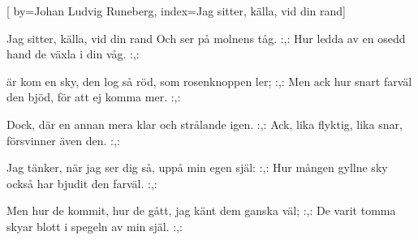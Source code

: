 
[
by={Johan Ludvig Runeberg},
index={Jag sitter, källa, vid din rand}]

\beginverse*
Jag sitter, källa, vid din rand 
Och ser på molnens tåg.
:,: Hur ledda av en osedd hand 
de växla i din våg. :,:
\endverse

\beginverse* 
är kom en sky, den log så röd, 
som rosenknoppen ler; 
:,: Men ack hur snart farväl den bjöd, 
för att ej komma mer. :,:
\endverse

\beginverse* 
Dock, där en annan mera klar 
och strålande igen. 
:,: Ack, lika flyktig, lika snar, 
försvinner även den. :,:
\endverse

\beginverse
Jag tänker, när jag ser dig så, 
uppå min egen själ:
:,: Hur mången gyllne sky också 
har bjudit den farväl. :,:
\endverse

\beginverse* Men hur de kommit, hur de gått,
jag känt dem ganska väl; 
:,: De varit tomma skyar blott
i spegeln av min själ. :,:
\endverse
\endsong


